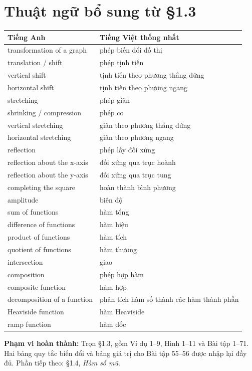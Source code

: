 \documentclass[12pt,a4paper]{article}
\begin{document}
\section*{Thuật ngữ bổ sung từ §1.3}
\begingroup\small
\begin{longtable}{p{.43\linewidth}p{.49\linewidth}}\toprule Tiếng Anh&Tiếng Việt thống nhất\\\midrule\endhead
transformation of a graph&phép biến đổi đồ thị\\
translation / shift&phép tịnh tiến\\
vertical shift&tịnh tiến theo phương thẳng đứng\\
horizontal shift&tịnh tiến theo phương ngang\\
stretching&phép giãn\\
shrinking / compression&phép co\\
vertical stretching&giãn theo phương thẳng đứng\\
horizontal stretching&giãn theo phương ngang\\
reflection&phép lấy đối xứng\\
reflection about the x-axis&đối xứng qua trục hoành\\
reflection about the y-axis&đối xứng qua trục tung\\
completing the square&hoàn thành bình phương\\
amplitude&biên độ\\
sum of functions&hàm tổng\\
difference of functions&hàm hiệu\\
product of functions&hàm tích\\
quotient of functions&hàm thương\\
intersection&giao\\
composition&phép hợp hàm\\
composite function&hàm hợp\\
decomposition of a function&phân tích hàm số thành các hàm thành phần\\
Heaviside function&hàm Heaviside\\
ramp function&hàm dốc\\
\bottomrule\end{longtable}
\endgroup
\noindent\textbf{Phạm vi hoàn thành:} Trọn §1.3, gồm Ví dụ 1–9, Hình 1–11 và Bài tập 1–71. Hai bảng quy tắc biến đổi và bảng giá trị cho Bài tập 55–56 được nhập lại đầy đủ. Phần tiếp theo: §1.4, \textit{Hàm số mũ}.
\end{document}
